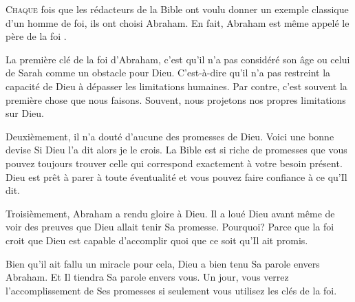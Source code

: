 



\lettrine{C}{haque} fois que les rédacteurs de la Bible ont voulu
 donner un exemple classique d'un homme de foi, ils ont choisi Abraham.
 En fait, Abraham est même appelé \Og le père de la foi \Fg{}.

La première clé de la foi d'Abraham, c'est qu'il n'a pas considéré
 son âge ou celui de Sarah comme un obstacle pour Dieu.
 C'est-à-dire qu'il n'a pas restreint la capacité de Dieu
 à dépasser les limitations humaines.
 Par contre, c'est souvent la première chose que nous faisons.
 Souvent, nous projetons nos propres limitations sur Dieu.

Deuxièmement, il n'a douté d'aucune des promesses de Dieu.
 Voici une bonne devise\frcolon{} \Og Si Dieu l'a dit alors je le crois. \Fg{}
 La Bible est si riche de promesses que vous pouvez toujours trouver
 celle qui correspond exactement à votre besoin présent.
 Dieu est prêt à parer à toute éventualité et vous pouvez
 faire confiance à ce qu'Il dit.

Troisièmement, Abraham a rendu gloire à Dieu.
 Il a loué Dieu avant même de voir des preuves que Dieu
 allait tenir Sa promesse. Pourquoi? Parce que la foi croit
 que Dieu est capable d'accomplir quoi que ce soit qu'Il ait promis.


Bien qu'il ait fallu un miracle pour cela, Dieu a bien tenu Sa parole
 envers Abraham. Et Il tiendra Sa parole envers vous.
 Un jour, vous verrez l'accomplissement de Ses promesses
 si seulement vous utilisez les clés de la foi.

\dvrule



